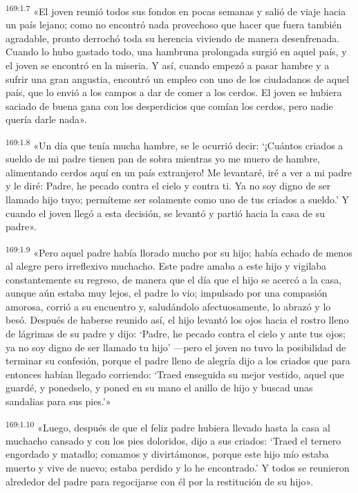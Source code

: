 \par 
\textsuperscript{169:1.7} «El joven reunió todos sus fondos en pocas semanas y salió de viaje hacia un país lejano; como no encontró nada provechoso que hacer que fuera también agradable, pronto derrochó toda su herencia viviendo de manera desenfrenada. Cuando lo hubo gastado todo, una hambruna prolongada surgió en aquel país, y el joven se encontró en la miseria. Y así, cuando empezó a pasar hambre y a sufrir una gran angustia, encontró un empleo con uno de los ciudadanos de aquel país, que lo envió a los campos a dar de comer a los cerdos. El joven se hubiera saciado de buena gana con los desperdicios que comían los cerdos, pero nadie quería darle nada».

\par 
\textsuperscript{169:1.8} «Un día que tenía mucha hambre, se le ocurrió decir: `¡Cuántos criados a sueldo de mi padre tienen pan de sobra mientras yo me muero de hambre, alimentando cerdos aquí en un país extranjero! Me levantaré, iré a ver a mi padre y le diré: Padre, he pecado contra el cielo y contra ti. Ya no soy digno de ser llamado hijo tuyo; permíteme ser solamente como uno de tus criados a sueldo.' Y cuando el joven llegó a esta decisión, se levantó y partió hacia la casa de su padre».

\par 
\textsuperscript{169:1.9} «Pero aquel padre había llorado mucho por su hijo; había echado de menos al alegre pero irreflexivo muchacho. Este padre amaba a este hijo y vigilaba constantemente su regreso, de manera que el día que el hijo se acercó a la casa, aunque aún estaba muy lejos, el padre lo vio; impulsado por una compasión amorosa, corrió a su encuentro y, saludándolo afectuosamente, lo abrazó y lo besó. Después de haberse reunido así, el hijo levantó los ojos hacia el rostro lleno de lágrimas de su padre y dijo: `Padre, he pecado contra el cielo y ante tus ojos; ya no soy digno de ser llamado tu hijo' ---pero el joven no tuvo la posibilidad de terminar su confesión, porque el padre lleno de alegría dijo a los criados que para entonces habían llegado corriendo: `Traed enseguida su mejor vestido, aquel que guardé, y ponedselo, y poned en su mano el anillo de hijo y buscad unas sandalias para sus pies.'»

\par 
\textsuperscript{169:1.10} «Luego, después de que el feliz padre hubiera llevado hasta la casa al muchacho cansado y con los pies doloridos, dijo a sus criados: `Traed el ternero engordado y matadlo; comamos y divirtámonos, porque este hijo mío estaba muerto y vive de nuevo; estaba perdido y lo he encontrado.' Y todos se reunieron alrededor del padre para regocijarse con él por la restitución de su hijo».

